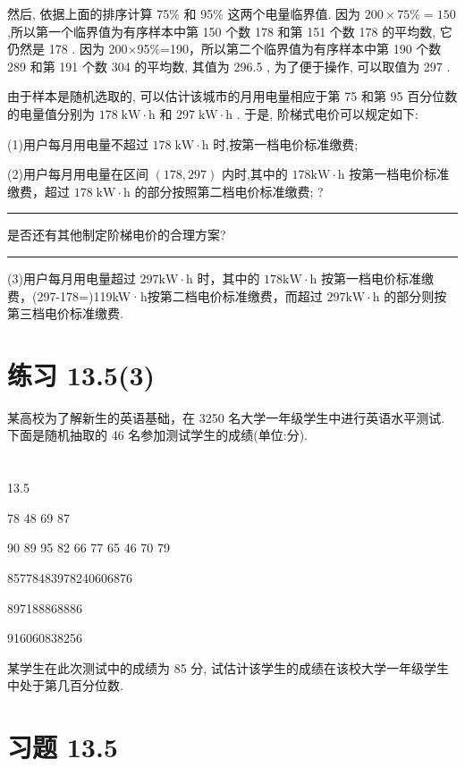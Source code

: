 \documentclass[10pt]{article}
\newcommand{\HRule}{\begin{center}\rule{0.9\linewidth}{0.2mm}\end{center}}
\begin{document}
然后, 依据上面的排序计算 75\% 和 95\% 这两个电量临界值. 因为 \({200} \times  {75}\%  = {150}\) ,所以第一个临界值为有序样本中第 150 个数 178 和第 151 个数 178 的平均数, 它仍然是 178 . 因为 200×95\%=190，所以第二个临界值为有序样本中第 190 个数 289 和第 191 个数 304 的平均数, 其值为 296.5 , 为了便于操作, 可以取值为 297 .

由于样本是随机选取的, 可以估计该城市的月用电量相应于第 75 和第 95 百分位数的电量值分别为 \({178}\mathrm{\;{kW}} \cdot  \mathrm{h}\) 和 \({297}\mathrm{\;{kW}} \cdot  \mathrm{h}\) . 于是, 阶梯式电价可以规定如下:

(1)用户每月用电量不超过 \({178}\mathrm{\;{kW}} \cdot  \mathrm{h}\) 时,按第一档电价标准缴费;

(2)用户每月用电量在区间 \(\left( {{178},{297}}\right)\) 内时,其中的 \({178}\mathrm{{kW}} \cdot  \mathrm{h}\) 按第一档电价标准缴费，超过 \({178}\mathrm{\;{kW}} \cdot  \mathrm{h}\) 的部分按照第二档电价标准缴费; ?

\HRule

是否还有其他制定阶梯电价的合理方案?

\HRule

(3)用户每月用电量超过 \({297}\mathrm{{kW}} \cdot  \mathrm{h}\) 时，其中的 \({178}\mathrm{{kW}} \cdot  \mathrm{h}\) 按第一档电价标准缴费，(297-178=)119kW·h按第二档电价标准缴费，而超过 \({297}\mathrm{{kW}} \cdot  \mathrm{h}\) 的部分则按第三档电价标准缴费.

\section*{练习 13.5(3)}

某高校为了解新生的英语基础，在 3250 名大学一年级学生中进行英语水平测试. 下面是随机抽取的 46 名参加测试学生的成绩(单位:分).

\section*{}

13.5

78 48 69 87

90 89 95 82 66 77 65 46 70 79

85778483978240606876

897188868886

916060838256

某学生在此次测试中的成绩为 85 分, 试估计该学生的成绩在该校大学一年级学生中处于第几百分位数.

\section*{习题 13.5}
\end{document}
